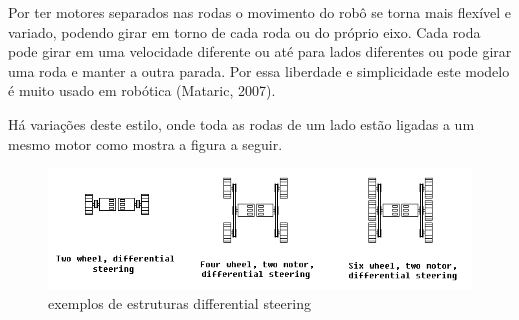 Por ter motores separados nas rodas o movimento do robô se torna mais flexível e variado, podendo girar em torno de cada roda ou do próprio eixo. Cada roda pode girar em uma velocidade diferente ou até para lados diferentes ou pode girar uma roda e manter a outra parada. Por essa liberdade e simplicidade este modelo é muito usado em robótica (Mataric, 2007).

Há variações deste estilo, onde toda as rodas de um lado estão ligadas a um mesmo motor como mostra a figura a seguir.

\begin{figure}[h]
	\centering
	\label{fig17}
		\includegraphics[keepaspectratio=true,scale=0.7]{figuras/3differentialSteering.png}
	\caption{exemplos de estruturas differential steering}
\end{figure}
